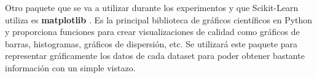 Otro paquete que se va a utilizar durante los experimentos y que Scikit-Learn utiliza es \textbf{matplotlib} \citep{matplotlib}. Es la principal biblioteca de gráficos científicos en Python y proporciona funciones para crear visualizaciones de calidad como gráficos de barras, histogramas, gráficos de dispersión, etc. Se utilizará este paquete para representar gráficamente los datos de cada dataset para poder obtener bastante información con un simple vistazo. 
































